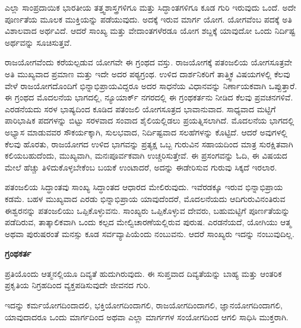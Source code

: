 \vskip 5pt

ಎಲ್ಲಾ ಸಾಂಪ್ರದಾಯಿಕ ಭಾರತೀಯ ತತ್ತ್ವಶಾಸ್ತ್ರಗಳಿಗೂ ಮತ್ತು ಸಿದ್ಧಾಂತಗಳಿಗೂ ಕೂಡ ಗುರಿ ಇರುವುದು ಒಂದೆ. ಅದೇ ಪೂರ್ಣತೆಯ ಮೂಲಕ ಮುಕ್ತಿಯನ್ನು ಪಡೆಯುವುದು. ಅದಕ್ಕೆ ಇರುವ ಮಾರ್ಗ ಯೋಗ. ಯೋಗವೆಂಬ ಪದಕ್ಕೆ ಅತಿ ವಿಶಾಲವಾದ ಅರ್ಥವಿದೆ. ಆದರೆ ಸಾಂಖ್ಯ ಮತ್ತು ವೇದಾಂತಗಳೆರಡೂ ಯೋಗ ಶಬ್ದಕ್ಕೆ ಯಾವುದೋ ಒಂದು ನಿರ್ದಿಷ್ಟ ಅರ್ಥವನ್ನು ಸೂಚಿಸುತ್ತವೆ.

\vskip 5pt

ರಾಜಯೋಗವೆಂದು ಕರೆಯಲ್ಪಡುವ ಯೋಗವೇ ಈ ಗ್ರಂಥದ ವಸ್ತು. ರಾಜಯೋಗಕ್ಕೆ ಪತಂಜಲಿಯ ಯೋಗಸೂತ್ರವೇ ಅತಿ ಮುಖ್ಯವಾದ ಪ್ರಮಾಣ ಮತ್ತು ಇದೇ ಅದರ ಪಠ್ಯಗ್ರಂಥ. ಉಳಿದ ದಾರ್ಶನಿಕರಿಗೆ ತಾತ್ತ್ವಿಕ ವಿಷಯಗಳಲ್ಲಿ ಕೆಲವು ವೇಳೆ ರಾಜಯೋಗದೊಂದಿಗೆ ಭಿನ್ನಾಭಿಪ್ರಾಯವಿದ್ದರೂ ಅದರ ಸಾಧನೆಯ ವಿಧಾನವನ್ನು ನಿರ್ಣಾಯಕವಾಗಿ ಒಪ್ಪುತ್ತಾರೆ. ಈ ಗ್ರಂಥದ ಮೊದಲನೆಯ ಭಾಗದಲ್ಲಿ, ನ್ಯೂಯಾರ್ಕ್​ ನಗರದಲ್ಲಿ ಈ ಗ್ರಂಥಕರ್ತನು ನೀಡಿದ ಕೆಲವು ಪ್ರವಚನಗಳಿವೆ. ಎರಡನೆಯದು ಸರಳ ಭಾಷ್ಯದಿಂದ ಕೂಡಿದ ಪತಂಜಲಿ ಯೋಗಸೂತ್ರದ ಭಾವಾನುವಾದ. ಸಾಧ್ಯವಾದ ಮಟ್ಟಿಗೆ ಪಾರಿಭಾಷಿಕ ಪದಗಳನ್ನು ಬಿಟ್ಟು ಸರಳವಾದ ಸಂವಾದ ಶೈಲಿಯಲ್ಲಿಡಲು ಪ್ರಯತ್ನಿಸಲಾಗಿದೆ. ಮೊದಲನೆಯ ಭಾಗದಲ್ಲಿ ಅಭ್ಯಾಸ ಮಾಡುವವರ ಸೌಕರ್ಯಕ್ಕಾಗಿ, ಸುಲಭವಾದ, ನಿರ್ದಿಷ್ಟವಾದ ಸಲಹೆಗಳನ್ನು ಕೊಟ್ಟಿದೆ. ಆದರೆ ಅವುಗಳಲ್ಲಿ ಕೆಲವು ಹೊರತು, ರಾಜಯೋಗದ ಉಳಿದ ಭಾಗವನ್ನು ಪ್ರತ್ಯಕ್ಷ ಒಬ್ಬ ಗುರುವಿನ ಸಹಾಯದಿಂದ ಮಾತ್ರ ಸುರಕ್ಷಿತವಾಗಿ ಕಲಿಯಬಹುದೆಂದು, ಮುಖ್ಯವಾಗಿ, ಮನಃಪೂರ್ವಕವಾಗಿ ಉಚ್ಚರಿಸುತ್ತೇವೆ. ಈ ಪ್ರಸಂಗವನ್ನು ಓದಿ, ಈ ವಿಷಯದ ಮೇಲೆ ಹೆಚ್ಚು ತಿಳಿದುಕೊಳ್ಳಬೇಕೆಂಬ ಬಯಕೆ ಉಂಟಾದರೆ, ಅದನ್ನು ಈಡೇರಿಸುವ ಗುರುವು ಸಿಕ್ಕದೆ ಇರಲಾರ.

ಪತಂಜಲಿಯ ಸಿದ್ಧಾಂತವು ಸಾಂಖ್ಯ ಸಿದ್ಧಾಂತದ ಆಧಾರದ ಮೇಲಿರುವುದು. ಇವೆರಡಕ್ಕೂ ಇರುವ ಭಿನ್ನಾಭಿಪ್ರಾಯ ಕಡಮೆ. ಬಹಳ ಮುಖ್ಯವಾದ ಎರಡು ಭಿನ್ನಾಭಿಪ್ರಾಯ ಯಾವುದೆಂದರೆ, ಮೊದಲನೆಯದು ಆದಿಗುರುವಿನಂತಿರುವ ಈಶ್ವರನನ್ನು ಪತಂಜಲಿಯು ಒಪ್ಪಿಕೊಳ್ಳುವನು. ಸಾಂಖ್ಯರು ಒಪ್ಪಿಕೊಳ್ಳುವ ದೇವರು, ಬಹುಮಟ್ಟಿಗೆ ಪೂರ್ಣತೆಯನ್ನು ಪಡೆದಿರುವ, ತಾತ್ಕಾಲಿಕವಾಗಿ ಒಂದು ಕಲ್ಪದ ಮೇಲ್ವಿಚಾರಣೆಯಲ್ಲಿರುವ ಪುರುಷ. ಎರಡನೆಯದೆ, ಯೋಗಿಯು ಆತ್ಮ ಅಥವಾ ಪುರುಷರಂತೆ ಮನಸ್ಸು ಕೂಡ ಸರ್ವವ್ಯಾಪಿಯೆಂದು ನಂಬುವನು. ಆದರೆ ಸಾಂಖ್ಯರು ಇದನ್ನು ನಂಬುವುದಿಲ್ಲ.

\begin{flushright}
\textbf{ಗ್ರಂಥಕರ್ತ}
\end{flushright}

\newpage

\thispagestyle{empty}

\vskip 5cm

\begin{center}
ಪ್ರತಿಯೊಂದು ಆತ್ಮನಲ್ಲಿಯೂ ದಿವ್ಯತೆ ಹುದುಗಿರುವುದು. ಈ ಸುಪ್ತವಾದ ದಿವ್ಯತೆಯನ್ನು ಬಾಹ್ಯ ಮತ್ತು ಆಂತರಿಕ ಪ್ರಕೃತಿಯ ನಿಗ್ರಹದಿಂದ ವ್ಯಕ್ತಪಡಿಸುವುದೇ ಜೀವನದ ಗುರಿ.
\end{center}

\begin{center}
ಇದನ್ನು ಕರ್ಮಯೋಗದಿಂದಾದಲಿ, ಭಕ್ತಿಯೋಗದಿಂದಾಗಲಿ, ರಾಜಯೋಗದಿಂದಾಗಲಿ, ಜ್ಞಾನಯೋಗದಿಂದಾಗಲಿ, ಯಾವುದಾದರೂ ಒಂದು ಮಾರ್ಗದಿಂದ ಅಥವಾ ಎಲ್ಲಾ ಮಾರ್ಗಗಳ ಸಂಯೋಗದಿಂದ ಆಗಲಿ ಸಾಧಿಸಿ ಮುಕ್ತರಾಗಿ.
\end{center}

